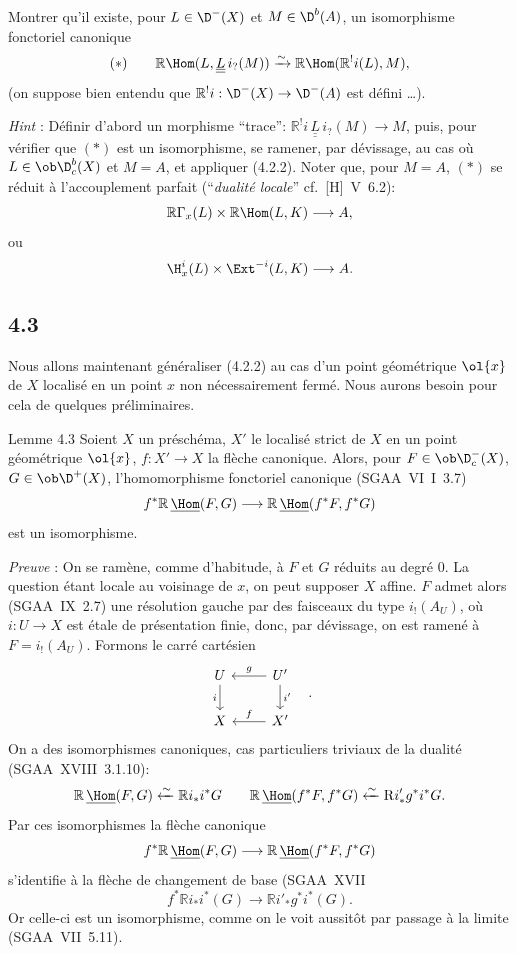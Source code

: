 Montrer qu'il existe, pour $L\in\D^-(X)$ et $M\in\D^b(A)$, un isomorphisme fonctoriel canonique
\[
(*)\qquad \mathbb{R}\Hom(L,\underline{\underline{L}}\, i_?(M))\xrightarrow{\sim}\mathbb{R}\Hom(\mathbb{R}^{!}i(L),M),
\]
(on suppose bien entendu que $\mathbb{R}^{!}i:\D^-(X)\to\D^-(A)$ est défini \dots).

\emph{Hint} : Définir d'abord un morphisme ``trace'': $\mathbb{R}^{!}i\,\underline{\underline{L}}\, i_?(M)\to M$, puis, pour vérifier que $(*)$ est un isomorphisme, se ramener, par dévissage, au cas où $L\in\ob\D_c^b(X)$ et $M=A$, et appliquer (4.2.2). Noter que, pour $M=A$, $(*)$ se réduit à l'accouplement parfait (``\emph{dualité locale}'' cf.~[H]~V~6.2):
\[
\mathbb{R}\Gamma_x(L)\times \mathbb{R}\Hom(L,K)\longrightarrow A,
\]
ou
\[
\H_x^i(L)\times \Ext^{-i}(L,K)\longrightarrow A.
\]

\subsection*{4.3}
Nous allons maintenant généraliser (4.2.2) au cas d'un point géométrique $\ol{x}$ de $X$ localisé en un point $x$ non nécessairement fermé. Nous aurons besoin pour cela de quelques préliminaires.

\begin{statement}{Lemme 4.3}
Soient $X$ un préschéma, $X'$ le localisé strict de $X$ en un point géométrique $\ol{x}$, $f:X'\to X$ la flèche canonique. Alors, pour $F\in\ob\D_c^-(X)$, $G\in\ob\D^+(X)$, l'homomorphisme fonctoriel canonique (SGAA~VI~I~3.7)
\[
f^*\mathbb{R}\,\underline{\Hom}(F,G)\longrightarrow \mathbb{R}\,\underline{\Hom}(f^*F,f^*G)
\]
est un isomorphisme.
\end{statement}

\emph{Preuve} : On se ramène, comme d'habitude, à $F$ et $G$ réduits au degré $0$. La question étant locale au voisinage de $x$, on peut supposer $X$ affine. $F$ admet alors (SGAA~IX~2.7) une résolution gauche par des faisceaux du type $i_!(A_U)$, où $i:U\to X$ est étale de présentation finie, donc, par dévissage, on est ramené à $F=i_!(A_U)$. Formons le carré cartésien
\[
\begin{tikzcd}
U \arrow[d,"i"'] & U' \arrow[l,"g"'] \arrow[d,"i'"] \\
X & X' \arrow[l,"f"']
\end{tikzcd}\quad .
\]
On a des isomorphismes canoniques, cas particuliers triviaux de la dualité (SGAA~XVIII~3.1.10):
\[
\mathbb{R}\,\underline{\Hom}(F,G)\xleftarrow{\sim}\mathbb{R} i_* i^*G
\qquad
\mathbb{R}\,\underline{\Hom}(f^*F,f^*G)\xleftarrow{\sim}\mathrm{R} i'_* g^*i^*G.
\]
Par ces isomorphismes la flèche canonique
\[
f^*\mathbb{R}\,\underline{\Hom}(F,G)\longrightarrow \mathbb{R}\,\underline{\Hom}(f^*F,f^*G)
\]
s'identifie à la flèche de changement de base (SGAA~XVII
\[
f^*\mathbb{R} i_*i^*(G)\longrightarrow \mathbb{R} i'_*g^*i^*(G).
\]
Or
celle-ci est un isomorphisme, comme on le voit aussitôt par passage à la limite (SGAA~VII~5.11).

